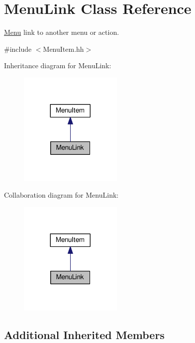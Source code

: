\hypertarget{classMenuLink}{}\section{Menu\+Link Class Reference}
\label{classMenuLink}


\hyperlink{classMenu}{Menu} link to another menu or action.  




{\ttfamily \#include $<$Menu\+Item.\+hh$>$}



Inheritance diagram for Menu\+Link\+:\nopagebreak
\begin{figure}[H]
\begin{center}
\leavevmode
\includegraphics[width=140pt]{classMenuLink__inherit__graph}
\end{center}
\end{figure}


Collaboration diagram for Menu\+Link\+:\nopagebreak
\begin{figure}[H]
\begin{center}
\leavevmode
\includegraphics[width=140pt]{classMenuLink__coll__graph}
\end{center}
\end{figure}
\subsection*{Additional Inherited Members}


